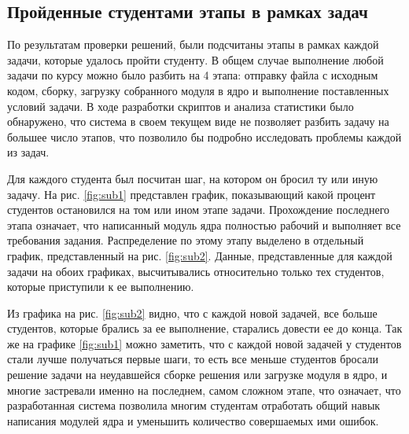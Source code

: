 \documentclass[a4paper,12pt]{article}
\begin{document}
\subsection{Пройденные студентами этапы в рамках задач}
По результатам проверки решений, были подсчитаны этапы в рамках каждой задачи, которые удалось пройти студенту. В общем случае выполнение любой задачи по курсу можно было разбить на 4 этапа: отправку файла с исходным кодом, сборку, загрузку собранного модуля в ядро и выполнение поставленных условий задачи. В ходе разработки скриптов и анализа статистики было обнаружено, что система в своем текущем виде не позволяет разбить задачу на большее число этапов, что позволило бы подробно исследовать проблемы каждой из задач.

Для каждого студента был посчитан шаг, на котором он бросил ту или иную задачу. На рис. \ref{fig:sub1} представлен график, показывающий какой процент студентов остановился на том или ином этапе задачи. Прохождение последнего этапа означает, что написанный модуль ядра полностью рабочий и выполняет все требования задания. Распределение по этому этапу выделено в отдельный график, представленный на рис. \ref{fig:sub2}. Данные, представленные для каждой задачи на обоих графиках, высчитывались относительно только тех студентов, которые приступили к ее выполнению.

Из графика на рис. \ref{fig:sub2} видно, что с каждой новой задачей, все больше студентов, которые брались за ее выполнение, старались довести ее до конца. Так же на графике \ref{fig:sub1} можно заметить, что с каждой новой задачей у студентов стали лучше получаться первые шаги, то есть все меньше студентов бросали решение задачи на неудавшейся сборке решения или загрузке модуля в ядро, и многие застревали именно на последнем, самом сложном  этапе, что означает, что разработанная система позволила многим студентам отработать общий навык написания модулей ядра и уменьшить количество совершаемых ими ошибок.
\end{document}
